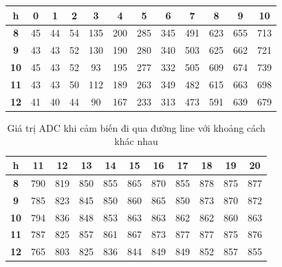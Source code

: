                 \begin{table}[H]
            \centering
            \begin{tabular}{|c|c|c|c|c|c|c|c|c|c|c|c|}
                \hline
                \textbf{h} & \textbf{0} & \textbf{1} & \textbf{2} & \textbf{3} & \textbf{4} & \textbf{5} & \textbf{6} & \textbf{7} & \textbf{8} & \textbf{9} & \textbf{10} \\
                \hline
                \textbf{8} & 45 & 44 & 54 & 135 & 200 & 285 & 345 & 491 & 623 & 655 & 713 \\
                \hline
                \textbf{9} & 43 & 43 & 52 & 130 & 190 & 280 & 340 & 503 & 625 & 662 & 721 \\
                \hline
                \textbf{10} & 45 & 43 & 52 & 93 & 195 & 277 & 332 & 505 & 609 & 674 & 739 \\
                \hline
                \textbf{11} & 43 & 43 & 50 & 112 & 189 & 263 & 349 & 482 & 615 & 663 & 698 \\
                \hline
                \textbf{12} & 41 & 40 & 44 & 90 & 167 & 233 & 313 & 473 & 591 & 639 & 679 \\
                \hline
            \end{tabular}
        \end{table}

        \begin{table}[H]
            \centering
            \begin{tabular}{|c|c|c|c|c|c|c|c|c|c|c|}
                \hline
                \textbf{h} & \textbf{11} & \textbf{12} & \textbf{13} & \textbf{14} & \textbf{15} & \textbf{16} & \textbf{17} & \textbf{18} & \textbf{19} & \textbf{20} \\
                \hline
                \textbf{8} & 790 & 819 & 850 & 855 & 865 & 870 & 855 & 878 & 875 & 877 \\
                \hline
                \textbf{9} & 785 & 823 & 845 & 850 & 860 & 865 & 850 & 873 & 870 & 872 \\
                \hline
                \textbf{10} & 794 & 836 & 848 & 853 & 863 & 863 & 862 & 862 & 860 & 863 \\
                \hline
                \textbf{11} & 787 & 825 & 857 & 861 & 867 & 873 & 877 & 877 & 875 & 876 \\
                \hline
                \textbf{12} & 765 & 803 & 825 & 836 & 844 & 849 & 849 & 852 & 857 & 855 \\
                \hline
            \end{tabular}
            \caption{Giá trị ADC khi cảm biến đi qua đường line với khoảng cách khác nhau}
            \label{tab:sensor-spacing-adc}
        \end{table}

